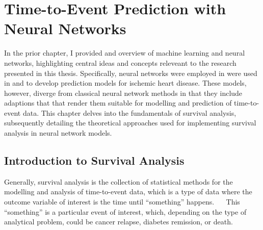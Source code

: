 \chapter{Time-to-Event Prediction with Neural Networks}
\label{chap:survival-analysis}


In the prior chapter, 
I provided and  overview of machine learning and neural networks,
highlighting central ideas and concepts releveant to the research presented
in this thesis.
Specifically, neural networks were employed in
were used in \studyii{} and \studyiii{} to develop
prediction models for ischemic heart disease.
These models, however, diverge from classical neural network methods
in that they include adaptions that that render them suitable for
modelling and prediction of time-to-event data.
This chapter delves into the fundamentals of survival analysis,
subsequently detailing the theoretical approaches used for implementing
survival analysis in neural network models.

\section{Introduction to Survival Analysis}

Generally, 
survival analysis is the collection of statistical methods
for the modelling and analysis of time-to-event data,
which is a type of data where the outcome variable of interest 
is the time until \enquote{something} happens.~%
~\autocite{kleinbaumSurvival2011}
This \enquote{something} is a particular event of interest,
which, depending on the type of analytical problem, 
could be cancer relapse, 
diabetes remission,
or death.

